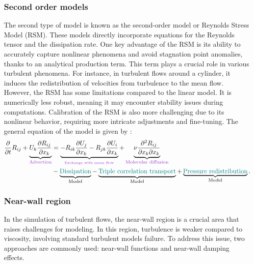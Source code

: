 \subsubsection{Second order models}
The second type of model is known as the second-order model or Reynolds Stress Model (RSM). These models directly incorporate equations for the Reynolds tensor and the dissipation rate. One key advantage of the RSM is its ability to accurately capture nonlinear phenomena and avoid stagnation point anomalies, thanks to an analytical production term. This term plays a crucial role in various turbulent phenomena. For instance, in turbulent flows around a cylinder, it induces the redistribution of velocities from turbulence to the mean flow. However, the RSM has some limitations compared to the linear model. It is numerically less robust, meaning it may encounter stability issues during computations. Calibration of the RSM is also more challenging due to its nonlinear behavior, requiring more intricate adjustments and fine-tuning. The general equation of the model is given by :
\begin{equation}
  \begin{aligned}
    \frac{\partial }{\partial t}R_{ij}+\underbrace{U_k\frac{\partial R_{ij}}{\partial x_k}}_{\color{mydarkorchid}\text{Advection}} &= \underbrace{-R_{ik}\frac{\partial U_j}{\partial x_k}-R_{jk}\frac{\partial U_i}{\partial x_k}}_{_{\color{mydarkorchid}\text{Exchange with mean flow}}} + \underbrace{\nu \frac{\partial^2 R_{ij}}{\partial x_k \partial x_k}}_{\color{mydarkorchid}\text{Molecular diffusion}}  \\ &  - \underbrace{{\color{myteal}\text{Dissipation}}}_{\text{Model}} - \underbrace{{\color{myteal}\text{Triple correlation transport}}}_{\text{Model}} + \underbrace{{\color{myteal}\text{Pressure redistribution}}}_{\text{Model}}.
 \end{aligned}
\end{equation}

\subsubsection{Near-wall region}

In the simulation of turbulent flows, the near-wall region is a crucial area that raises challenges for modeling. In this region, turbulence is weaker compared to viscosity, involving standard turbulent models failure. To address this issue, two approaches are commonly used: near-wall functions and near-wall damping effects.

